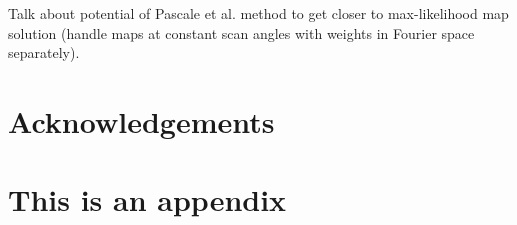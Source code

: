 \documentclass[useAMS,usenatbib,nofootinbib]{mn2e}
\begin{document}
Talk about potential of Pascale et al. method to get closer to
max-likelihood map solution (handle maps at constant scan angles with
weights in Fourier space separately).

\section{Acknowledgements}





\appendix
\section[]{This is an appendix}
\end{document}
